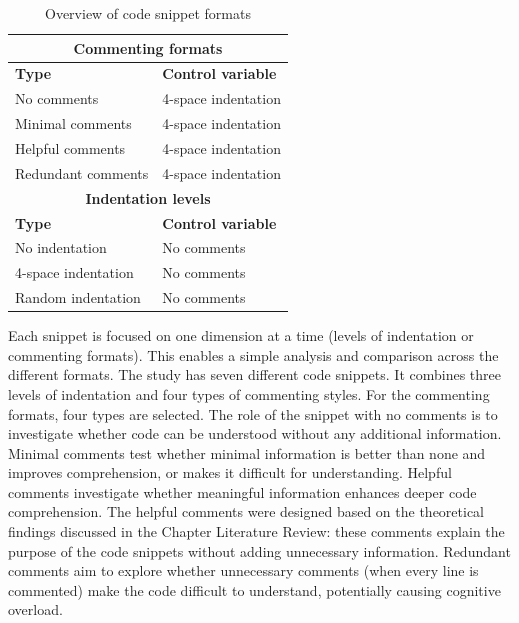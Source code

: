 \begin{table}[ht]
\centering
\small
\caption{Overview of code snippet formats}
\begin{tabular}{|p{6cm}|p{6cm}|}
\hline
\multicolumn{2}{|c|}{\rule{0pt}{1.2em}\textbf{Commenting formats}} \\[0.5em]
\hline
\rule{0pt}{1.2em}\textbf{Type} & \textbf{Control variable} \\[0.5em]
\hline 
\rule{0pt}{1.2em}No comments & 4-space indentation \\[0.5em]
\hline
\rule{0pt}{1.2em}Minimal comments & 4-space indentation \\[0.5em]
\hline
\rule{0pt}{1.2em}Helpful comments & 4-space indentation \\[0.5em]
\hline
\rule{0pt}{1.2em}Redundant comments & 4-space indentation \\[0.5em]
\hline
\multicolumn{2}{|c|}{\rule{0pt}{1.2em}\textbf{Indentation levels}} \\[0.5em]
\hline
\rule{0pt}{1.2em}\textbf{Type} & \textbf{Control variable} \\[0.5em]
\hline
\rule{0pt}{1.2em}No indentation & No comments \\[0.5em]
\hline
\rule{0pt}{1.2em}4-space indentation & No comments \\[0.5em]
\hline
\rule{0pt}{1.2em}Random indentation & No comments \\[0.5em]
\hline
\end{tabular}
\label{tab:snippet_control}
\end{table}



Each snippet is focused on one dimension at a time (levels of indentation or commenting formats). This enables a simple analysis and comparison across the different formats. The study has seven different code snippets. It combines three levels of indentation and four types of commenting styles. For the commenting formats, four types are selected.  The role of the snippet with no comments is to investigate whether code can be understood without any additional information.  Minimal comments test whether minimal information is better than none and improves comprehension, or makes it difficult for understanding.
Helpful comments investigate whether meaningful information enhances deeper code comprehension. The helpful comments were designed based on the theoretical findings discussed in the Chapter Literature Review: these comments explain the purpose of the code snippets without adding unnecessary information. Redundant comments aim to explore whether unnecessary comments
(when every line is commented) make the code difficult to understand, potentially causing cognitive overload.


